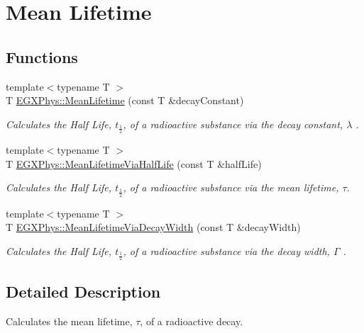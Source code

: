 \hypertarget{group___e_g_x_phys-_mean_lifetime}{}\section{Mean Lifetime}
\label{group___e_g_x_phys-_mean_lifetime}
\subsection*{Functions}
\begin{DoxyCompactItemize}
\item 
{\footnotesize template$<$typename T $>$ }\\T \hyperlink{group___e_g_x_phys-_mean_lifetime_gaa9e3c2deedda4bc7a745568b06fc47eb}{E\+G\+X\+Phys\+::\+Mean\+Lifetime} (const T \&decay\+Constant)
\begin{DoxyCompactList}\small\item\em Calculates the Half Life, $t_{\frac{1}{2}}$, of a radioactive substance via the decay constant, $\lambda$ . \end{DoxyCompactList}\item 
{\footnotesize template$<$typename T $>$ }\\T \hyperlink{group___e_g_x_phys-_mean_lifetime_ga2586e148263e1f6c8ff89f269a0930ea}{E\+G\+X\+Phys\+::\+Mean\+Lifetime\+Via\+Half\+Life} (const T \&half\+Life)
\begin{DoxyCompactList}\small\item\em Calculates the Half Life, $t_{\frac{1}{2}}$, of a radioactive substance via the mean lifetime, $\tau$. \end{DoxyCompactList}\item 
{\footnotesize template$<$typename T $>$ }\\T \hyperlink{group___e_g_x_phys-_mean_lifetime_ga8a1dda4168b4b25db93bf1ae7832fd7e}{E\+G\+X\+Phys\+::\+Mean\+Lifetime\+Via\+Decay\+Width} (const T \&decay\+Width)
\begin{DoxyCompactList}\small\item\em Calculates the Half Life, $t_{\frac{1}{2}}$, of a radioactive substance via the decay width, $\Gamma$ . \end{DoxyCompactList}\end{DoxyCompactItemize}


\subsection{Detailed Description}
Calculates the mean lifetime, $\tau$, of a radioactive decay. 

